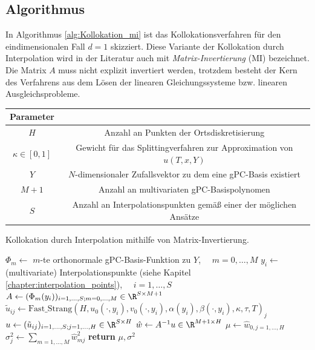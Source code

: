 \subsection{Algorithmus}
In Algorithmus \ref{alg:Kollokation_mi} ist das Kollokationsverfahren für den eindimensionalen Fall $d=1$ skizziert. Diese Variante der Kollokation durch Interpolation wird in der Literatur auch mit \emph{Matrix-Invertierung} (MI) bezeichnet. Die Matrix $A$ muss nicht explizit invertiert werden, trotzdem besteht der Kern des Verfahrens aus dem Lösen der linearen Gleichungssysteme bzw. linearen Ausgleichsprobleme.\\
\begin{tabular}{c|c}
Parameter & \\
\hline
$H$ & Anzahl an Punkten der Ortsdiskretisierung\\
$\kappa\in [0,1]$ & Gewicht für das Splittingverfahren zur Approximation von $u(T,x,Y)$\\
$Y$ & $N$-dimensionaler Zufallsvektor zu dem eine gPC-Basis existiert\\
$M+1$ & Anzahl an multivariaten gPC-Basispolynomen\\
$S$ & Anzahl an Interpolationspunkten gemäß einer der möglichen Ansätze
\end{tabular}
\begin{algorithm}[ht]
    \caption{Kollokation durch Interpolation mithilfe von Matrix-Invertierung.}
    \label{alg:Kollokation_mi}
    \begin{algorithmic}[1] %
            \State $\Phi_m\gets$ $m$-te orthonormale gPC-Basis-Funktion zu $Y$, $\quad m=0,\dots,M$
            \State $y_i\gets$ (multivariate) Interpolationspunkte (siehe Kapitel \ref{chapter:interpolation_points}), $\quad i=1,\dots,S$
            \State $A\gets (\Phi_m(y_i))_{i=1,\dots,S;m=0,\dots,M}\in\R^{S\times M+1}$
           		\State $\tilde{u}_{ij}\gets \text{Fast\_Strang}(H,u_0(\cdot, y_i),v_0(\cdot, y_i),\alpha(y_i),\beta(\cdot, y_i),\kappa,\tau,T)_j$
           	\EndFor
            \State $u\gets (\tilde{u}_{ij})_{i=1,\dots,S;j=1,\dots,H}\in\R^{S\times H}$
            \State $\hat{w}\gets A^{-1}u\in\R^{M+1\times H}$
            \State {}
			\State $\mu\gets \hat{w}_{0,j=1,\dots,H}$ 
			\State $\sigma^2_j\gets \sum_{m=1,\dots,M}\hat{w}^2_{mj}$
			\State \textbf{return} $\mu,\sigma^2$         
        \EndFunction
    \end{algorithmic}
\end{algorithm}
